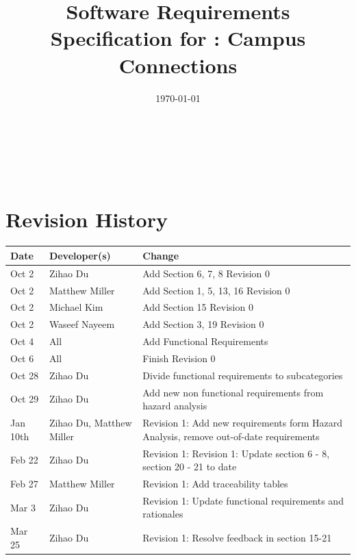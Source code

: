 \documentclass[12pt]{article}
\begin{document}

\title{Software Requirements Specification for \progname: Campus Connections} 
\author{\authname}
\date{\today}
	
\maketitle

~\newpage


\tableofcontents

~\newpage

\section*{Revision History}

\begin{tabularx}{\textwidth}{p{3cm}p{3cm}X}
\toprule {\textbf{Date}} & {\textbf{Developer(s)}} & {\textbf{Change}}\\
\midrule
Oct 2 & Zihao Du & Add Section 6, 7, 8 Revision 0\\
Oct 2 & Matthew Miller & Add Section 1, 5, 13, 16 Revision 0\\
Oct 2 & Michael Kim & Add Section 15 Revision 0\\
Oct 2 & Waseef Nayeem & Add Section 3, 19 Revision 0\\
Oct 4 & All & Add Functional Requirements\\
Oct 6 & All & Finish Revision 0\\
Oct 28 & Zihao Du & Divide functional requirements to subcategories\\
Oct 29 & Zihao Du & Add new non functional requirements from hazard analysis\\
Jan 10th & Zihao Du, Matthew Miller & Revision 1: Add new requirements form Hazard Analysis, remove out-of-date requirements\\
Feb 22 & Zihao Du & Revision 1: Revision 1: Update section 6 - 8, section 20 - 21 to date\\
Feb 27 & Matthew Miller & Revision 1: Add traceability tables\\
Mar 3 & Zihao Du & Revision 1: Update functional requirements and rationales\\
Mar 25 & Zihao Du & Revision 1: Resolve feedback in section 15-21\\
\bottomrule
\end{tabularx}

~\\
\end{document}
